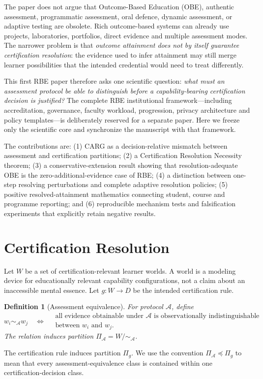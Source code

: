 \documentclass[11pt]{article}
\newtheorem{definition}{Definition}
\newcommand{\cA}{\mathcal A}\newcommand{\cE}{\mathcal E}\newcommand{\cW}{\mathcal W}
\begin{document}
The paper does not argue that Outcome-Based Education (OBE), authentic assessment, programmatic assessment, oral defence, dynamic assessment, or adaptive testing are obsolete. Rich outcome-based systems can already use projects, laboratories, portfolios, direct evidence and multiple assessment modes. The narrower problem is that \emph{outcome attainment does not by itself guarantee certification resolution}: the evidence used to infer attainment may still merge learner possibilities that the intended credential would need to treat differently.

This first RBE paper therefore asks one scientific question: \emph{what must an assessment protocol be able to distinguish before a capability-bearing certification decision is justified?} The complete RBE institutional framework---including accreditation, governance, faculty workload, progression, privacy architecture and policy templates---is deliberately reserved for a separate paper. Here we freeze only the scientific core and synchronize the manuscript with that framework.

The contributions are: (1) CARG as a decision-relative mismatch between assessment and certification partitions; (2) a Certification Resolution Necessity theorem; (3) a conservative-extension result showing that resolution-adequate OBE is the zero-additional-evidence case of RBE; (4) a distinction between one-step resolving perturbations and complete adaptive resolution policies; (5) positive resolved-attainment mathematics connecting student, course and programme reporting; and (6) reproducible mechanism tests and falsification experiments that explicitly retain negative results.

\section{Certification Resolution}
Let $W$ be a set of certification-relevant learner worlds. A world is a modeling device for educationally relevant capability configurations, not a claim about an inaccessible mental essence. Let $g:W\rightarrow D$ be the intended certification rule.

\begin{definition}[Assessment equivalence]
For protocol $\cA$, define
\[
w_i\sim_{\cA}w_j
\quad\Longleftrightarrow\quad
\begin{array}{c}
\text{all evidence obtainable under }\cA\text{ is observationally indistinguishable}\\
\text{between }w_i\text{ and }w_j.
\end{array}
\]
The relation induces partition $\Pi_{\cA}=W/\!\sim_{\cA}$.
\end{definition}
The certification rule induces partition $\Pi_g$. We use the convention $\Pi_{\cA}\preceq\Pi_g$ to mean that every assessment-equivalence class is contained within one certification-decision class.
\end{document}
